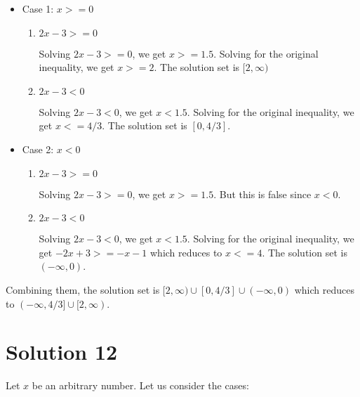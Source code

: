 \documentclass{article}
\begin{document}
\begin{itemize}
\item Case 1: $x >= 0$

  \begin{enumerate}
  \item $2x - 3 >= 0$

    Solving $2x - 3 >= 0$, we get $x >= 1.5$. Solving for the original
    inequality, we get $ x >= 2$. The solution set is $[2, \infty)$
    
  \item $2x - 3 < 0$

    Solving $2x - 3 < 0$, we get $x < 1.5$. Solving for the original
    inequality, we get $x <= 4/3$. The solution set is $[0, 4/3]$.
  \end{enumerate}

\item Case 2: $x < 0$

  \begin{enumerate}
  \item $2x - 3 >= 0$

    Solving $2x - 3 >= 0$, we get $x >= 1.5$. But this is false since
    $x < 0$.
    
  \item $2x - 3 < 0$

    Solving $2x - 3 < 0$, we get $x < 1.5$. Solving for the original
    inequality, we get $-2x + 3 >= -x - 1$ which reduces to $x <= 4$.
    The solution set is $(-\infty, 0)$.
  \end{enumerate}

\end{itemize}

Combining them, the solution set is
$[2, \infty) \cup [0, 4/3] \cup (-\infty, 0)$ which reduces to
$(-\infty, 4/3] \cup [2, \infty)$.

\section{Solution 12}

Let $x$ be an arbitrary number. Let us consider the cases:
\end{document}

